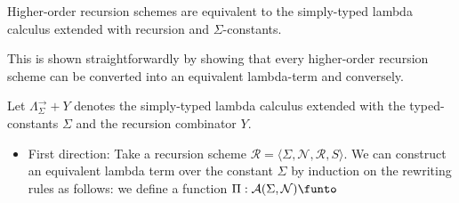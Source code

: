\newcommand\lcalculrec{\Lambda^{\rightarrow}_\Sigma+Y}

\begin{proposition}
Higher-order recursion schemes are equivalent to the simply-typed lambda calculus extended with recursion and $\Sigma$-constants.
\end{proposition}
This is shown straightforwardly by showing that every higher-order recursion scheme can be converted into an equivalent lambda-term and conversely.

Let $\lcalculrec$ denotes the simply-typed lambda calculus extended with the typed-constants $\Sigma$ and the recursion combinator $Y$.


\begin{itemize}
\item First direction: Take a recursion scheme $\mathcal{R} = \langle \Sigma, \mathcal{N}, \mathcal{R}, S \rangle$.
We can construct an equivalent lambda term over the constant $\Sigma$ by induction on the rewriting rules as follows: we define a function $\Pi : \mathcal{A}(\Sigma,\mathcal{N}) \funto $ 

\end{itemize}